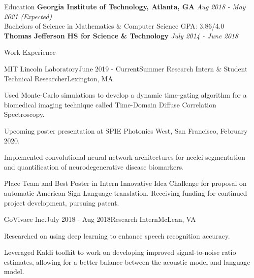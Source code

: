 \documentclass{template} %
\begin{document}

\begin{rSection}{Education}
{\bf Georgia Institute of Technology, Atlanta, GA} \hfill {\em Aug 2018 - May 2021 (Expected)}
\\ Bachelors of Science in Mathematics \& Computer Science \hfill  GPA: 3.86/4.0 \medskip
\\ {\bf Thomas Jefferson HS for Science \& Technology} \hfill {\em July 2014 - June 2018}
\end{rSection}


\begin{rSection}{Work Experience}

\begin{rSubsection}{MIT Lincoln Laboratory}{June 2019 - Current}{Summer Research Intern \& Student Technical Researcher}{Lexington, MA}
\item Used Monte-Carlo simulations to develop a  dynamic time-gating algorithm for a biomedical imaging technique called Time-Domain Diffuse Correlation Spectroscopy. 
\item Upcoming poster presentation at SPIE Photonics West, San Francisco, February 2020.
\item Implemented convolutional neural network architectures for neclei segmentation and quantification of neurodegenerative disease biomarkers.
\item{} Place Team and Best Poster in Intern Innovative Idea Challenge for proposal on automatic American Sign Language translation. Receiving funding for continued project development, pursuing patent.
\end{rSubsection}

\begin{rSubsection}{GoVivace Inc.}{July 2018 - Aug 2018}{Research Intern}{McLean, VA}
\item Researched on using deep learning to enhance speech recognition accuracy.
\item Leveraged Kaldi toolkit to work on developing improved signal-to-noise ratio estimates, allowing for a better balance between the acoustic model and language model.
\end{rSubsection}

\end{rSection}
\vspace{-2mm}

\end{document}
